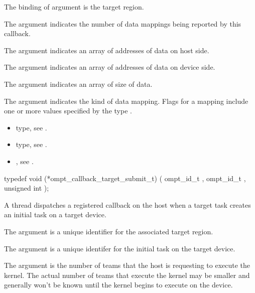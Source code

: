 The binding of argument  is the target region.

The argument  indicates the number of data mappings being reported by this callback.

The argument  indicates an array of addresses of
data on host side.

The argument  indicates an array of addresses
of data on device side.

The argument  indicates an array of size of data.

The argument  indicates the kind of data
mapping. Flags for a mapping include one or more values specified by the type
.

\codeptrdesc


\crossreferences
\begin{itemize}
\item {} type, see
.
\item {} type, see
.
\item {},
see .
\end{itemize}


\label{sec:ompt_callback_target_submit_t}
\format

\begin{ccppspecific}
\begin{omptCallback}
typedef void (*ompt_callback_target_submit_t) (
  ompt_id_t ,
  ompt_id_t ,
  unsigned int 
);
\end{omptCallback}
\end{ccppspecific}


\descr
A thread dispatches a registered  callback on the host when
a target task creates an initial task on a target device.

\argdesc

The argument  is a unique identifier for the
associated target region.

The argument  is a unique identifer for the
initial task on the target device.

The argument  is the number of teams that the host is requesting to
execute the kernel. The actual number of teams that execute the kernel may be smaller and generally won't be
known until the kernel begins to execute on the device.

